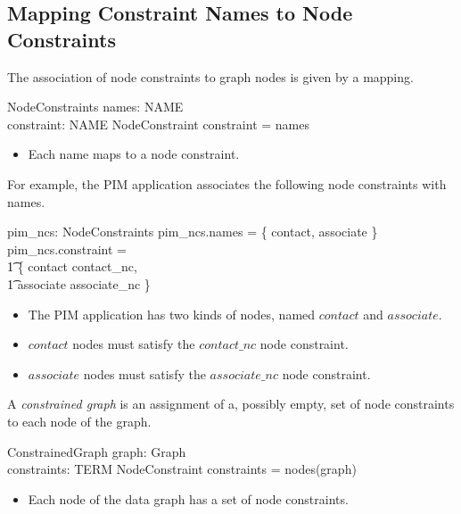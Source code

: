 \documentclass{article}
\begin{document}
\subsection{Mapping Constraint Names to Node Constraints}

The association of node constraints to graph nodes is given by a mapping.
\begin{schema}{NodeConstraints}
	names: \finset NAME \\
	constraint: NAME \pfun NodeConstraint
\where
	\dom constraint = names
\end{schema}
\begin{itemize}
\item Each name maps to a node constraint.
\end{itemize}

For example, the PIM application associates the following node constraints with names.
\begin{axdef}
	pim\_ncs: NodeConstraints
\where
	pim\_ncs.names = \{ contact, associate \}
\also
	pim\_ncs.constraint = \\
\t1		\{ contact \mapsto contact\_nc, \\
\t1		associate \mapsto associate\_nc \}
\end{axdef}
\begin{itemize}
\item The PIM application has two kinds of nodes, named $contact$ and $associate$.
\item $contact$ nodes must satisfy the $contact\_nc$ node constraint.
\item $associate$ nodes must satisfy the $associate\_nc$ node constraint.
\end{itemize}

A {\em constrained graph} is an assignment of a, possibly empty, set of node constraints to each node of the graph.
\begin{schema}{ConstrainedGraph}
	graph: Graph \\
	constraints: TERM \pfun \finset NodeConstraint
\where
	\dom constraints = nodes(graph)
\end{schema}
\begin{itemize}
\item Each node of the data graph has a set of node constraints.
\end{itemize}
\end{document}
